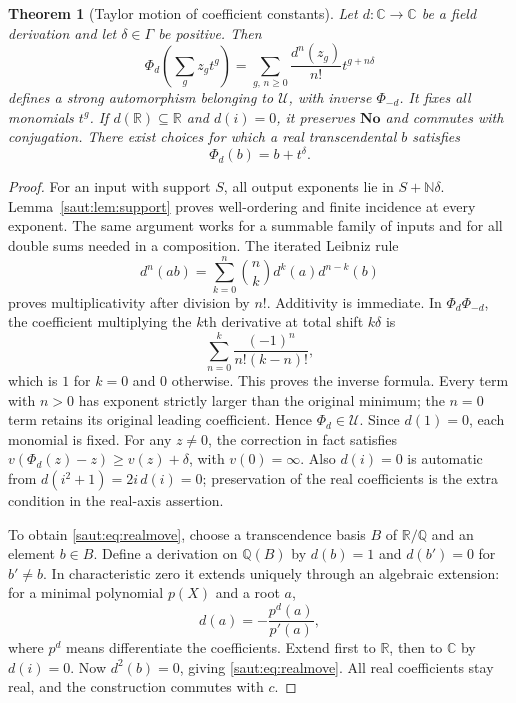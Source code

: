 \documentclass[11pt]{article}
\newtheorem{theorem}{Theorem}[section]
\theoremstyle{definition}
\theoremstyle{remark}
\newcommand{\No}{\mathbf{No}}
\newcommand{\R}{\mathbb R}
\newcommand{\C}{\mathbb C}
\newcommand{\Q}{\mathbb Q}
\newcommand{\N}{\mathbb N}
\newcommand{\U}{\mathcal U}
\numberwithin{equation}{section}
\begin{document}
\begin{theorem}[Taylor motion of coefficient constants]\label{saut:thm:coeffflow}
Let $d:\C\to\C$ be a field derivation and let $\delta\in\Gamma$ be
positive. Then
\begin{equation}\label{saut:eq:coeffflow}
 \Phi_d\left(\sum_g z_gt^g\right)
 =\sum_{g,\,n\ge0}\frac{d^n(z_g)}{n!}t^{g+n\delta}
\end{equation}
defines a strong automorphism belonging to $\U$, with inverse $\Phi_{-d}$.
It fixes all monomials $t^g$. If $d(\R)\subseteq\R$ and $d(i)=0$, it
preserves $\No$ and commutes with conjugation.
There exist choices for which a real transcendental $b$ satisfies
\begin{equation}\label{saut:eq:realmove}
 \Phi_d(b)=b+t^\delta.
\end{equation}
\end{theorem}
\begin{proof}
For an input with support $S$, all output exponents lie in $S+\N\delta$.
Lemma~\ref{saut:lem:support} proves well-ordering and finite incidence at every
exponent. The same argument works for a summable family of inputs and for
all double sums needed in a composition.
The iterated Leibniz rule
\[
 d^n(ab)=\sum_{k=0}^n\binom nk d^k(a)d^{n-k}(b)
\]
proves multiplicativity after division by $n!$. Additivity is immediate.
In $\Phi_d\Phi_{-d}$, the coefficient multiplying the $k$th derivative at total
shift $k\delta$ is
\[
 \sum_{n=0}^k\frac{(-1)^n}{n!(k-n)!},
\]
which is $1$ for $k=0$ and $0$ otherwise. This proves the inverse formula.
Every term with $n>0$ has exponent strictly larger than the original
minimum; the $n=0$ term retains its original leading coefficient. Hence
$\Phi_d\in\U$. Since $d(1)=0$, each monomial is fixed.
For any $z\ne0$, the correction in fact satisfies
$v(\Phi_d(z)-z)\ge v(z)+\delta$, with $v(0)=\infty$.
Also $d(i)=0$ is automatic from $d(i^2+1)=2i\,d(i)=0$; preservation of
the real coefficients is the extra condition in the real-axis assertion.

To obtain \eqref{saut:eq:realmove}, choose a transcendence basis $B$ of $\R/\Q$
and an element $b\in B$. Define a derivation on $\Q(B)$ by $d(b)=1$ and
$d(b')=0$ for $b'\ne b$. In characteristic zero it extends uniquely through
an algebraic extension: for a minimal polynomial $p(X)$ and a root $a$,
\[
 d(a)=-\frac{p^d(a)}{p'(a)},
\]
where $p^d$ means differentiate the coefficients. Extend first to $\R$,
then to $\C$ by $d(i)=0$. Now $d^2(b)=0$, giving \eqref{saut:eq:realmove}.
All real coefficients stay real, and the construction commutes with $c$.
\end{proof}
\end{document}

